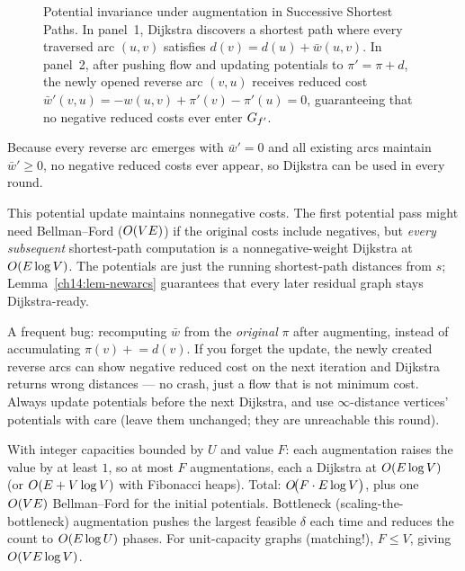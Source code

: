 \begin{figure}[H]
\caption{Potential invariance under augmentation in Successive Shortest Paths. In panel~1, Dijkstra discovers a shortest path where every traversed arc $(u,v)$ satisfies $d(v)=d(u)+\bar w(u,v)$. In panel~2, after pushing flow and updating potentials to $\pi'=\pi+d$, the newly opened reverse arc $(v,u)$ receives reduced cost $\bar w'(v,u)=-w(u,v)+\pi'(v)-\pi'(u)=0$, guaranteeing that no negative reduced costs ever enter $G_{f'}$.}
\label{ch14:fig-ssp-potentials}
\end{figure}

Because every reverse arc emerges with $\bar w'=0$ and all existing arcs maintain $\bar w'\ge 0$, no negative reduced costs ever appear, so Dijkstra can be used in every round.

\begin{whybox}
This potential update maintains nonnegative costs. The first potential pass might need Bellman--Ford ($O(VE)$) if the original costs include negatives, but \emph{every subsequent} shortest-path computation is a nonnegative-weight Dijkstra at $O(E\log V)$. The potentials are just the running shortest-path distances from $s$; Lemma~\ref{ch14:lem-newarcs} guarantees that every later residual graph stays Dijkstra-ready.
\end{whybox}

\begin{trapbox}
A frequent bug: recomputing $\bar w$ from the \emph{original} $\pi$ after augmenting, instead of accumulating $\pi(v)\mathrel{+}=d(v)$. If you forget the update, the newly created reverse arcs can show negative reduced cost on the next iteration and Dijkstra returns wrong distances --- no crash, just a flow that is not minimum cost. Always update potentials before the next Dijkstra, and use $\infty$-distance vertices' potentials with care (leave them unchanged; they are unreachable this round).
\end{trapbox}

\begin{complexitybox}
With integer capacities bounded by $U$ and value $F$: each augmentation raises the value by at least $1$, so at most $F$ augmentations, each a Dijkstra at $O(E\log V)$ (or $O(E + V\log V)$ with Fibonacci heaps). Total: $O\!\big(F\cdot E\log V\big)$, plus one $O(VE)$ Bellman--Ford for the initial potentials. Bottleneck (scaling-the-bottleneck) augmentation pushes the largest feasible $\delta$ each time and reduces the count to $O(E\log U)$ phases. For unit-capacity graphs (matching!), $F\le V$, giving $O(VE\log V)$.
\end{complexitybox}

